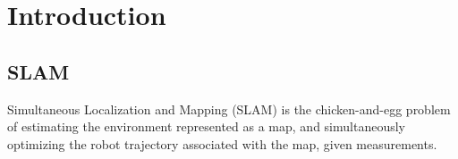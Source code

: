 
\chapter{Introduction} \label{secIntro}






% 
\section{SLAM}

Simultaneous Localization and Mapping (SLAM) is the chicken-and-egg problem of estimating the environment represented as a map, and simultaneously optimizing the robot trajectory associated with the map, given measurements.

